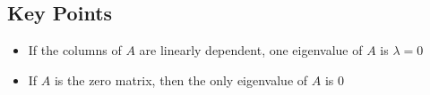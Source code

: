 \documentclass{article}
\begin{document}
\subsection*{Key Points}
\begin{itemize}
    \item If the columns of $A$ are linearly dependent, one eigenvalue of $A$ is $\lambda=0$
    \item If $A$ is the zero matrix, then the only eigenvalue of $A$ is $0$
\end{itemize}
\end{document}
